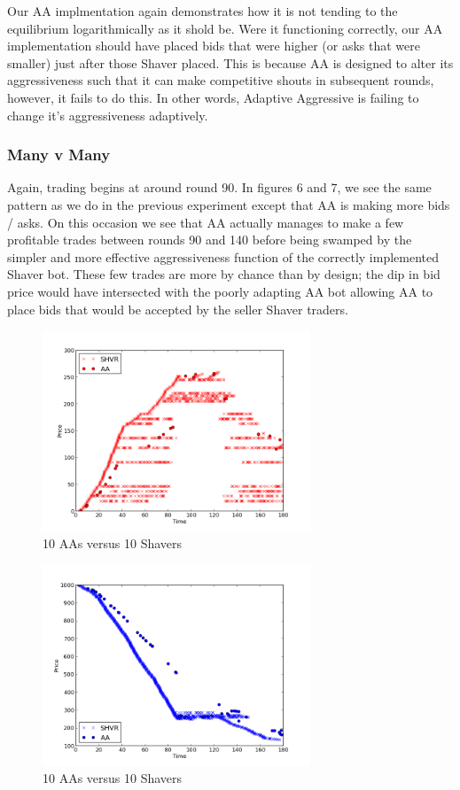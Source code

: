 \documentclass{acm_proc_article-sp}
\begin{document}
Our AA implmentation again demonstrates how it is not tending to the
equilibrium logarithmically as it shold be. Were it functioning correctly, our
AA implementation should have placed bids that were higher (or asks that were
smaller) just after those Shaver placed. This is because AA is designed to
alter its aggressiveness such that it can make competitive shouts in subsequent
rounds, however, it fails to do this. In other words, Adaptive Aggressive is
failing to change it's aggressiveness adaptively.

\subsubsection{Many v Many} Again, trading begins at around round 90. In figures
6 and 7, we see the same pattern as we do in the previous experiment except that
AA is making more bids / asks. On this occasion we see that AA actually manages
to make a few profitable trades between rounds 90 and 140 before being swamped
by the simpler and more effective aggressiveness function of the correctly
implemented Shaver bot. These few trades are more by chance than by design; the
dip in bid price would have intersected with the poorly adapting AA bot allowing
AA to place bids that would be accepted by the seller Shaver traders.

\begin{figure}[h!] \includegraphics[width=80mm]{SHVR10AA10_180_all_bids.png}
\caption {10 AAs versus 10 Shavers}
\end{figure}

\begin{figure}[h!] \includegraphics[width=80mm]{SHVR10AA10_180_all_asks.png}
\caption {10 AAs versus 10 Shavers}
\end{figure}
\end{document}
